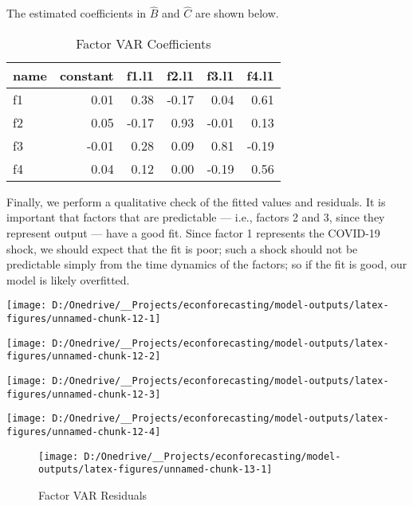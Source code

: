 \documentclass[11pt, letterpaper]{article}\usepackage[]{graphicx}\usepackage[]{color}
\begin{document}
The estimated coefficients in $\widehat{B}$ and $\widehat{C}$ are shown below.
\begin{table}[H]
\centering
\begingroup\footnotesize
\begin{tabular}{lrrrrr}
  \hline
name & constant & f1.l1 & f2.l1 & f3.l1 & f4.l1 \\ 
  \hline
f1 & 0.01 & 0.38 & -0.17 & 0.04 & 0.61 \\ 
  f2 & 0.05 & -0.17 & 0.93 & -0.01 & 0.13 \\ 
  f3 & -0.01 & 0.28 & 0.09 & 0.81 & -0.19 \\ 
  f4 & 0.04 & 0.12 & 0.00 & -0.19 & 0.56 \\ 
   \hline
\end{tabular}
\endgroup
\caption{Factor VAR Coefficients} 
\end{table}



Finally, we perform a qualitative check of the fitted values and residuals. It is important that factors that are predictable --- i.e., factors 2 and 3, since they represent output --- have a good fit. Since factor 1 represents the COVID-19 shock, we should expect that the fit is poor; such a shock should not be predictable simply from the time dynamics of the factors; so if the fit is good, our model is likely overfitted.


{\centering \texttt{[image: D:/Onedrive/\_\_Projects/econforecasting/model-outputs/latex-figures/unnamed-chunk-12-1]} 

}




{\centering \texttt{[image: D:/Onedrive/\_\_Projects/econforecasting/model-outputs/latex-figures/unnamed-chunk-12-2]} 

}




{\centering \texttt{[image: D:/Onedrive/\_\_Projects/econforecasting/model-outputs/latex-figures/unnamed-chunk-12-3]} 

}




{\centering \texttt{[image: D:/Onedrive/\_\_Projects/econforecasting/model-outputs/latex-figures/unnamed-chunk-12-4]} 

}





\begin{figure}[H]

{\centering \texttt{[image: D:/Onedrive/\_\_Projects/econforecasting/model-outputs/latex-figures/unnamed-chunk-13-1]} 

}

\caption[Factor VAR Residuals]{Factor VAR Residuals}\label{fig:unnamed-chunk-13}
\end{figure}
\end{document}
